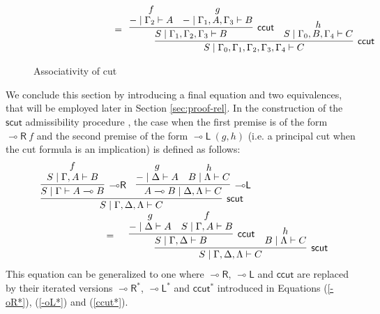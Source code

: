 \documentclass[sn-mathphys-num]{sn-jnl}%
\newcommand{\GG}{\Gamma}
\newcommand{\GD}{\Delta}
\newcommand{\GL}{\Lambda}
\newcommand{\vd}{\vdash}
\newcommand{\lolli}{\multimap}
\newcommand{\lleft}{{\lolli}\mathsf{L}}
\newcommand{\lright}{{\lolli}\mathsf{R}}
\newcommand{\proofbox}[1]{\begin{tabular}{l} #1 \end{tabular}}
\newcommand{\mf}[1]{\mathsf{#1}}
\theoremstyle{thmstyleone}%
\theoremstyle{thmstyletwo}%
\theoremstyle{thmstylethree}%
\begin{document}
\begin{figure}
\begin{displaymath}
\begin{array}{l}
\begin{array}{c}
      \end{array}
      \\[20pt]
      \qquad \qquad \qquad \qquad   =
      \begin{array}{c}
        \infer[\mf{ccut}]{S \mid \GG_0 , \GG_1 , \GG_2 , \GG_3 , \GG_4 \vd C}{
        \infer[\mf{ccut}]{S \mid \GG_1 , \GG_2 , \GG_3 \vd B}{
        \deduce{{-} \mid \GG_2 \vd A}{f}
        &
        \deduce{{-} \mid \GG_1 , A , \GG_3 \vd B}{g}
        }
        &
        \deduce{S \mid \GG_0 , B , \GG_4 \vd C}{h}
        }
      \end{array}
    \end{array}
  \end{displaymath}
  \caption{Associativity of cut}
  \label{fig:asscut}
\end{figure}

We conclude this section by introducing a final equation and two equivalences, that will be employed later in Section \ref{sec:proof-rel}.
In the construction of the $\mathsf{scut}$ admissibility procedure \cite{UVW:protsn,wan2024}, the case when the first premise is of the form $\lright\ f$ and the second premise of the form $\lleft\ (g,h)$ (i.e. a principal cut when the cut formula is an implication) is defined as follows:
\[
\begin{array}{l}
  \proofbox{
  \infer[\mathsf{scut}]{S \mid \GG,\GD,\GL \vd C}{
  \infer[\lright]{S \mid \GG \vd A \lolli B}{
  \deduce{S \mid \GG, A \vd B}{f}
  }
  &
  \infer[\lleft]{A \lolli B \mid \GD,\GL \vd C}{
  \deduce{{-} \mid \GD \vd A}{g}
  &
  \deduce{B \mid \GL \vd C}{h}
  }
  }
  }\\
  \qquad\qquad \qquad\qquad =
  \proofbox{
  \infer[\mathsf{scut}]{S \mid \GG,\GD,\GL \vd C}{
  \infer[\mathsf{ccut}]{S \mid \GG, \GD \vd B}{
  \deduce{{-} \mid \GD \vd A}{g}
  &
  \deduce{S \mid \GG, A \vd B}{f}
  }
  &
  \deduce{B \mid \GL \vd C}{h}
  }
  }
\end{array}
\]
This equation can be generalized to one where $\lright$, $\lleft$ and $\mathsf{ccut}$ are replaced by their iterated versions $\lright^*$, $\lleft^*$ and $\mathsf{ccut^*}$ introduced in Equations (\ref{-oR*}), (\ref{-oL*}) and (\ref{ccut*}). 
\end{document}

